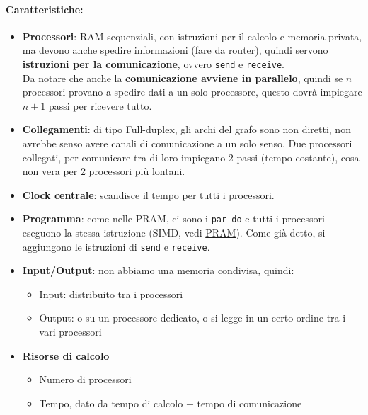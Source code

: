 	\paragraph{Caratteristiche:}
	\begin{itemize}
		\item \textbf{Processori}: RAM sequenziali, con istruzioni per il calcolo e memoria privata, ma devono anche spedire informazioni (fare da router), quindi servono \textbf{istruzioni per la comunicazione}, ovvero \texttt{send} e \texttt{receive}.\\
		Da notare che anche la \textbf{comunicazione avviene in parallelo}, quindi se $n$ processori provano a spedire dati a un solo processore, questo dovrà impiegare $n+1$ passi per ricevere tutto.\\
		
		\item \textbf{Collegamenti}: di tipo Full-duplex, gli archi del grafo sono non diretti, non avrebbe senso avere canali di comunicazione a un solo senso. Due processori collegati, per comunicare tra di loro impiegano 2 passi (tempo costante), cosa non vera per 2 processori più lontani.\\
		
		\item \textbf{Clock centrale}: scandisce il tempo per tutti i processori.\\
		
		\item \textbf{Programma}: come nelle PRAM, ci sono i \texttt{par do} e tutti i processori eseguono la stessa istruzione (SIMD, vedi \hyperref[subsubsec:PRAM]{PRAM}). Come già detto, si aggiungono le istruzioni di \texttt{send} e \texttt{receive}.\\
		
		\item \textbf{Input/Output}: non abbiamo una memoria condivisa, quindi: 
		\begin{itemize}
			\item Input: distribuito tra i processori
			\item Output: o su un processore dedicato, o si legge in un certo ordine tra i vari processori
		\end{itemize}
		\nn
		
		\item \textbf{Risorse di calcolo}
		\begin{itemize}
			\item Numero di processori
			\item Tempo, dato da tempo di calcolo $+$ tempo di comunicazione
		\end{itemize}
	\end{itemize}
	
